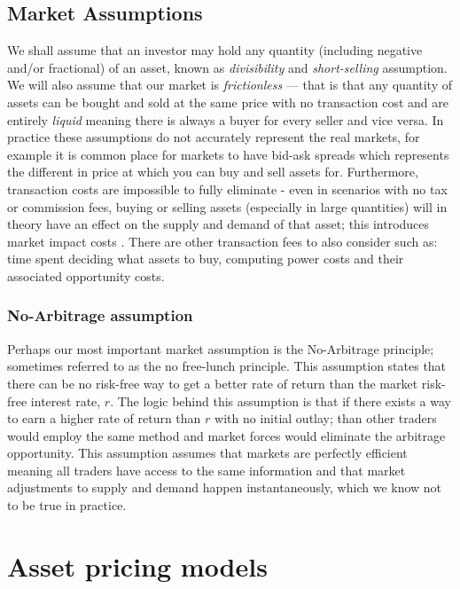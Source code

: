 \subsection{Market Assumptions}

We shall assume that an investor may hold any quantity (including negative and/or fractional) of an asset, known as \textit{divisibility} and \textit{short-selling} assumption. We will also assume that our market is \textit{frictionless} --- that is that any quantity of assets can be bought and sold at the same price with no transaction cost and are entirely \textit{liquid} meaning there is always a buyer for every seller and vice versa.
\nline{}
In practice these assumptions do not accurately represent the real markets, for example it is common place for markets to have bid-ask spreads which represents the different in price at which you can buy and sell assets for. Furthermore, transaction costs are impossible to fully eliminate - even in scenarios with no tax or commission fees, buying or selling assets (especially in large quantities) will in theory have an effect on the supply and demand of that asset; this introduces market impact costs \cite{moro2009market}. There are other transaction fees to also consider such as: time spent deciding what assets to buy, computing power costs and their associated opportunity costs.

\subsubsection{No-Arbitrage assumption}

Perhaps our most important market assumption is the No-Arbitrage principle; sometimes referred to as the no free-lunch principle. This assumption states that there can be no risk-free way to get a better rate of return than the market risk-free interest rate, \(r\). The logic behind this assumption is that if there exists a way to earn a higher rate of return than \(r\) with no initial outlay; than other traders would employ the same method and market forces would eliminate the arbitrage opportunity. This assumption assumes that markets are perfectly efficient meaning all traders have access to the same information and that market adjustments to supply and demand happen instantaneously, which we know not to be true in practice.

\section{Asset pricing models}

